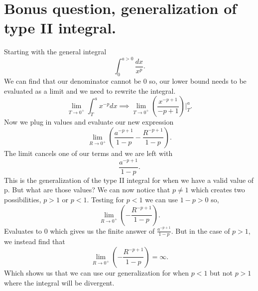 \section*{Bonus question, generalization of type II integral.}%
Starting with the general integral
\[
\int_{0}^{a>0} \frac{dx}{x^{p}}
.\] 
We can find that our denominator cannot be 0 so, our lower bound needs to be evaluated as a limit and we need to rewrite the integral.
\[
\lim_{T \to 0^{+}} \int_{T}^{a} x^{-p}dx \implies \lim_{T \to 0^{+}} \left( \frac{x^{-p+1}}{-p+1} \right) \Big|_{T}^{a}
.\] 
Now we plug in values and evaluate our new expression
\[
\lim_{R \to 0^{+}} \left( \frac{a^{-p+1}}{1-p}- \frac{R^{-p+1}}{1-p} \right) 
.\] 
The limit cancels one of our terms and we are left with
\[
\frac{a^{-p+1}}{1-p}
.\] 
This is the generalization of the type II integral for when we have a valid value of p. But what are those values?
We can now notice that $p\neq 1$ which creates two possibilities, $p>1$ or $p<1$.
Testing for $p<1$ we can use $1-p>0$ so,
\[
\lim_{R \to 0^{+}} \left( - \frac{R^{-p+1}}{1-p} \right) 
.\] 
Evaluates to 0 which gives us the finite answer of $\frac{a^{-p+1}}{1-p}$. But in the case of $p>1$, we instead find that 
\[
\lim_{R \to 0^{+}} \left( - \frac{R^{-p+1}}{1-p} \right) = \infty
.\] 
Which shows us that we can use our generalization for when $p<1$ but not $p>1$ where the integral will be divergent.
